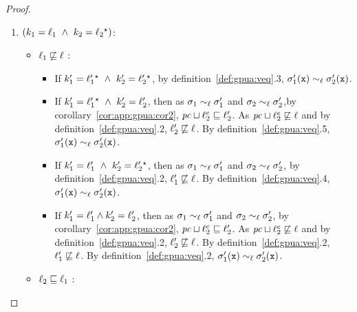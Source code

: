\begin{proof}
\begin{enumerate}
\begin{itemize}
\begin{enumerate}
\item $(k_1 = \ell_1 ~\wedge~k_2 = 
    \ell_2 {}^\star  )$:
\begin{itemize}
 \item $\ell_1 \not\sqsubseteq \ell$ : 
\begin{itemize}
\item  If $k_1' =  \ell_1'{}^\star   ~\wedge~k_2' =
 \ell_2'{}^\star  $, by definition~\ref{def:gpua:veq}.3,
$\sigma_1'(\texttt{x})   \sim_\ell \sigma_2'(\texttt{x})$.
\item If $k_1' =   \ell_1'{}^\star  ~\wedge~k_2' = \ell_2' $, then as $\sigma_1
  \sim_\ell \sigma_1'$ and $\sigma_2 \sim_\ell \sigma_2'$,by 
corollary~\ref{cor:app:gpua:cor2}, $\mathit{pc} \sqcup \ell^e_2 \sqsubseteq \ell_2'$. As $\mathit{pc} \sqcup \ell^e_2 \not\sqsubseteq \ell$ and by
  definition~\ref{def:gpua:veq}.2, $\ell_2' \not\sqsubseteq \ell$.  By
  definition~\ref{def:gpua:veq}.5, $\sigma_1'(\texttt{x}) 
  \sim_\ell \sigma_2'(\texttt{x})$.
\item  If $k_1' = \ell_1' ~\wedge~k_2' =  
 \ell_2' {}^\star  $, then as $\sigma_1
  \sim_\ell \sigma_1'$ and $\sigma_2 \sim_\ell \sigma_2'$, by
  definition~\ref{def:gpua:veq}.2, $\ell_1' \not\sqsubseteq \ell$.
  By definition~\ref{def:gpua:veq}.4, $\sigma_1'(\texttt{x})
  \sim_\ell \sigma_2'(\texttt{x})$.
\item If $k_1' = \ell_1' \wedge k_2' = \ell_2'$, then as $\sigma_1
  \sim_\ell \sigma_1'$ and $\sigma_2 \sim_\ell \sigma_2'$, by 
  corollary~\ref{cor:app:gpua:cor2}, $\mathit{pc} \sqcup \ell^e_2\sqsubseteq \ell_2'$. As $\mathit{pc} \sqcup \ell^e_2\not\sqsubseteq \ell$ and by
  definition~\ref{def:gpua:veq}.2, $\ell_2' \not\sqsubseteq \ell$. By
  definition~\ref{def:gpua:veq}.2, $\ell_1' \not\sqsubseteq \ell$.
  By definition~\ref{def:gpua:veq}.2, $\sigma_1'(\texttt{x})
  \sim_\ell \sigma_2'(\texttt{x})$.
\end{itemize}
\item $\ell_2 \sqsubseteq \ell_1$ :
\end{itemize}
\end{enumerate}
\end{itemize}
\end{enumerate}
\end{proof}

